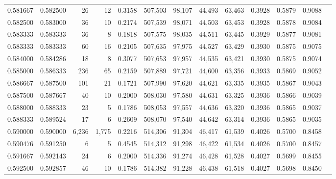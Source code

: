 \begin{tabular}{rrrrrrrrrrrrr}
0.581667 & 0.582500 &     26 &    12 &                                     0.3158 & 507,503 &  98,107 &  44,493 &  63,463 & 0.3928 & 0.5879 & 0.9088 \\
0.582500 & 0.583000 &     36 &    10 &                                     0.2174 & 507,539 &  98,071 &  44,503 &  63,453 & 0.3928 & 0.5878 & 0.9084 \\
0.583333 & 0.583333 &     36 &     8 &                                     0.1818 & 507,575 &  98,035 &  44,511 &  63,445 & 0.3929 & 0.5877 & 0.9081 \\
0.583333 & 0.583333 &     60 &    16 &                                     0.2105 & 507,635 &  97,975 &  44,527 &  63,429 & 0.3930 & 0.5875 & 0.9075 \\
0.584000 & 0.584286 &     18 &     8 &                                     0.3077 & 507,653 &  97,957 &  44,535 &  63,421 & 0.3930 & 0.5875 & 0.9074 \\
0.585000 & 0.586333 &    236 &    65 &                                     0.2159 & 507,889 &  97,721 &  44,600 &  63,356 & 0.3933 & 0.5869 & 0.9052 \\
0.586667 & 0.587500 &    101 &    21 &                                     0.1721 & 507,990 &  97,620 &  44,621 &  63,335 & 0.3935 & 0.5867 & 0.9043 \\
0.587500 & 0.587667 &     40 &    10 &                                     0.2000 & 508,030 &  97,580 &  44,631 &  63,325 & 0.3936 & 0.5866 & 0.9039 \\
0.588000 & 0.588333 &     23 &     5 &                                     0.1786 & 508,053 &  97,557 &  44,636 &  63,320 & 0.3936 & 0.5865 & 0.9037 \\
0.588333 & 0.589524 &     17 &     6 &                                     0.2609 & 508,070 &  97,540 &  44,642 &  63,314 & 0.3936 & 0.5865 & 0.9035 \\
0.590000 & 0.590000 &  6,236 & 1,775 &                                     0.2216 & 514,306 &  91,304 &  46,417 &  61,539 & 0.4026 & 0.5700 & 0.8458 \\
0.590476 & 0.591250 &      6 &     5 &                                     0.4545 & 514,312 &  91,298 &  46,422 &  61,534 & 0.4026 & 0.5700 & 0.8457 \\
0.591667 & 0.592143 &     24 &     6 &                                     0.2000 & 514,336 &  91,274 &  46,428 &  61,528 & 0.4027 & 0.5699 & 0.8455 \\
0.592500 & 0.592857 &     46 &    10 &                                     0.1786 & 514,382 &  91,228 &  46,438 &  61,518 & 0.4027 & 0.5698 & 0.8450 \\

\end{tabular}
